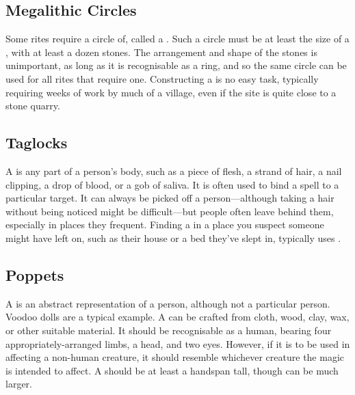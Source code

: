 \subsection{Megalithic Circles}

Some rites require a circle of, called a .
Such a circle must be at least the size of a , with at least a dozen stones.
The arrangement and shape of the stones is unimportant, as long as it is recognisable as a ring, and so the same circle can be used for all rites that require one.
Constructing a  is no easy task, typically requiring weeks of work by much of a village, even if the site is quite close to a stone quarry.

\subsection{Taglocks}

A  is any part of a person's body, such as a piece of flesh, a strand of hair, a nail clipping, a drop of blood, or a gob of saliva.
It is often used to bind a spell to a particular target.
It can always be picked off a person---although taking a hair without being noticed might be difficult---but people often leave  behind them, especially in places they frequent.
Finding a  in a place you suspect someone might have left on, such as their house or a bed they've slept in, typically uses .

\subsection{Poppets}

A  is an abstract representation of a person, although not a particular person.
Voodoo dolls are a typical example.
A  can be crafted from cloth, wood, clay, wax, or other suitable material.
It should be recognisable as a human, bearing four appropriately-arranged limbs, a head, and two eyes.
However, if it is to be used in  affecting a non-human creature, it should resemble whichever creature the magic is intended to affect.
A  should be at least a handspan tall, though can be much larger.

